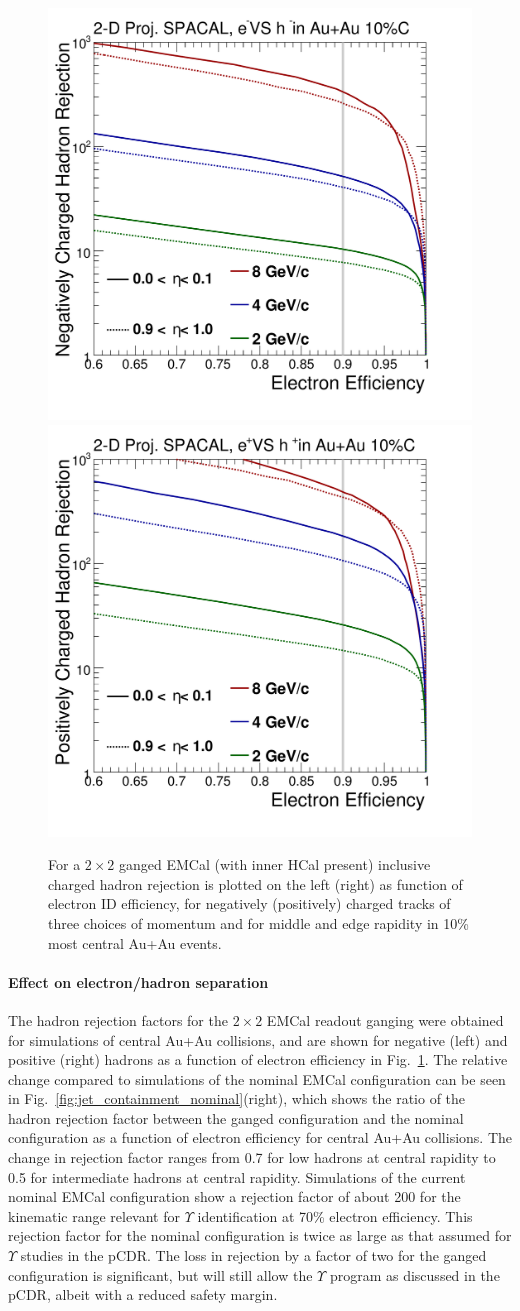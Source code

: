 \begin{figure}[hbt]
  \centering
  \includegraphics[width=0.4\linewidth]{figs/DrawEcal_Likelihood_Sum_RejectionCurve_AuAuSummary}
  \hspace{0.1\linewidth}
  \includegraphics[width=0.4\linewidth]{figs/DrawEcal_Likelihood_Sum_RejectionCurve_AuAuSummaryPos}
  \caption{For a $2\times2$ ganged EMCal (with inner HCal present)
    inclusive charged hadron rejection is plotted on the left (right)
    as function of electron ID efficiency, for negatively (positively)
    charged tracks of three choices of momentum and for middle and
    edge rapidity in 10\% most central Au+Au events.}
  \label{fig:eid_auau}
\end{figure}

\paragraph{Effect on electron/hadron separation}

The hadron rejection factors for the $2\times 2$ EMCal readout ganging
were obtained for \hijing simulations of central Au+Au collisions, and
are shown for negative (left) and positive (right) hadrons as a
function of electron efficiency in Fig.~\ref{fig:eid_auau}.  The
relative change compared to simulations of the nominal EMCal
configuration can be seen in
Fig.~\ref{fig:jet_containment_nominal}(right), which shows the ratio
of the hadron rejection factor between the ganged configuration and
the nominal configuration as a function of electron efficiency for
central Au+Au collisions. The change in rejection factor ranges from
0.7 for low \pt hadrons at central rapidity to 0.5 for intermediate
\pt hadrons at central rapidity. Simulations of the current nominal
EMCal configuration show a rejection factor of about 200 for the
kinematic range relevant for $\Upsilon$ identification at 70\%
electron efficiency. This rejection factor for the nominal
configuration is twice as large as that assumed for $\Upsilon$ studies
in the pCDR. The loss in rejection by a factor of two for the ganged
configuration is significant, but will still allow the $\Upsilon$
program as discussed in the pCDR, albeit with a reduced safety margin.

